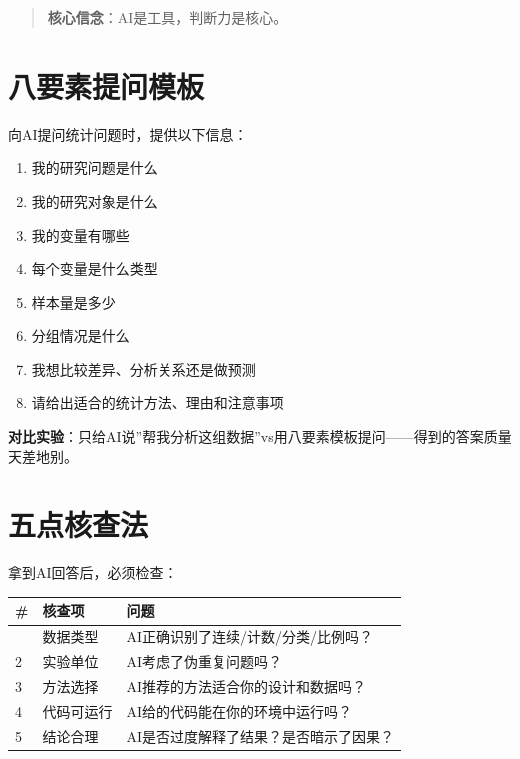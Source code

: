 \documentclass[
  letterpaper,
]{scrbook}
\newcounter{none} %
\providecommand{\tightlist}{%
  \setlength{\itemsep}{0pt}\setlength{\parskip}{0pt}}
\begin{document}
\begin{quote}
\textbf{核心信念}：AI是工具，判断力是核心。
\end{quote}

\section{八要素提问模板}\label{ux516bux8981ux7d20ux63d0ux95eeux6a21ux677f}

向AI提问统计问题时，提供以下信息：

\begin{enumerate}
\def\labelenumi{\arabic{enumi}.}
\tightlist
\item
  我的研究问题是什么
\item
  我的研究对象是什么
\item
  我的变量有哪些
\item
  每个变量是什么类型
\item
  样本量是多少
\item
  分组情况是什么
\item
  我想比较差异、分析关系还是做预测
\item
  请给出适合的统计方法、理由和注意事项
\end{enumerate}

\begin{tcolorbox}[enhanced jigsaw, arc=.35mm, bottomrule=.15mm, bottomtitle=1mm, breakable, colback=white, colbacktitle=quarto-callout-tip-color!10!white, colframe=quarto-callout-tip-color-frame, coltitle=black, left=2mm, leftrule=.75mm, opacityback=0, opacitybacktitle=0.6, rightrule=.15mm, title=\textcolor{quarto-callout-tip-color}{\faLightbulb}\hspace{0.5em}{Tip}, titlerule=0mm, toprule=.15mm, toptitle=1mm]

\textbf{对比实验}：只给AI说''帮我分析这组数据''vs用八要素模板提问------得到的答案质量天差地别。

\end{tcolorbox}

\section{五点核查法}\label{ux4e94ux70b9ux6838ux67e5ux6cd5}

拿到AI回答后，必须检查：

{\def\LTcaptype{none} %
\begin{longtable}[]{@{}lll@{}}
\toprule\noalign{}
\# & 核查项 & 问题 \\
\midrule\noalign{}
\endhead
\bottomrule\noalign{}
\endlastfoot
1 & 数据类型 & AI正确识别了连续/计数/分类/比例吗？ \\
2 & 实验单位 & AI考虑了伪重复问题吗？ \\
3 & 方法选择 & AI推荐的方法适合你的设计和数据吗？ \\
4 & 代码可运行 & AI给的代码能在你的环境中运行吗？ \\
5 & 结论合理 & AI是否过度解释了结果？是否暗示了因果？ \\
\end{longtable}
}
\end{document}
